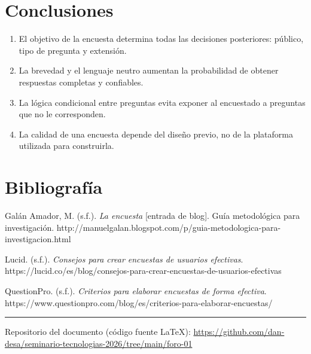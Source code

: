 \documentclass[
  spanish,
  12pt,
  letterpaper,
]{article}
\providecommand{\tightlist}{%
  \setlength{\itemsep}{0pt}\setlength{\parskip}{0pt}}
\begin{document}
\section{Conclusiones}\label{conclusiones}

\begin{enumerate}
\def\labelenumi{\arabic{enumi}.}
\tightlist
\item
  El objetivo de la encuesta determina todas las decisiones posteriores:
  público, tipo de pregunta y extensión.
\item
  La brevedad y el lenguaje neutro aumentan la probabilidad de obtener
  respuestas completas y confiables.
\item
  La lógica condicional entre preguntas evita exponer al encuestado a
  preguntas que no le corresponden.
\item
  La calidad de una encuesta depende del diseño previo, no de la
  plataforma utilizada para construirla.
\end{enumerate}

\section{Bibliografía}\label{bibliografuxeda}

Galán Amador, M. (s.f.). \emph{La encuesta} {[}entrada de blog{]}. Guía
metodológica para investigación.
http://manuelgalan.blogspot.com/p/guia-metodologica-para-investigacion.html

Lucid. (s.f.). \emph{Consejos para crear encuestas de usuarios
efectivas}.
https://lucid.co/es/blog/consejos-para-crear-encuestas-de-usuarios-efectivas

QuestionPro. (s.f.). \emph{Criterios para elaborar encuestas de forma
efectiva}.
https://www.questionpro.com/blog/es/criterios-para-elaborar-encuestas/

\begin{center}\rule{0.5\linewidth}{0.5pt}\end{center}

Repositorio del documento (código fuente LaTeX):
\url{https://github.com/dan-desa/seminario-tecnologias-2026/tree/main/foro-01}
\end{document}
